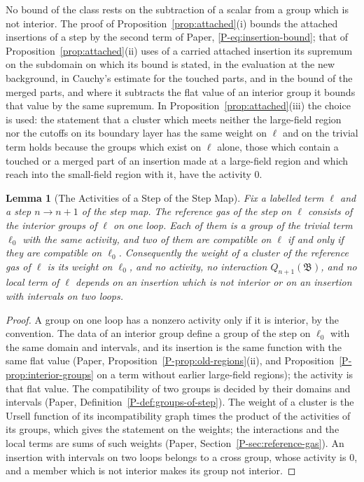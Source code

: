 \documentclass[11pt]{preprint}
\numberwithin{equation}{section}
\newtheorem{lemma}{Lemma}[section]
\theoremstyle{definition}
\theoremstyle{remark}
\theoremstyle{plain}
\begin{document}
No bound of the class rests on the subtraction of a scalar from a group which is not interior. The proof of Proposition~\ref{prop:attached}(i) bounds the attached insertions of a step by the second term of Paper, \eqref{P-eq:insertion-bound}; that of Proposition~\ref{prop:attached}(ii) uses of a carried attached insertion its supremum on the subdomain on which its bound is stated, in the evaluation at the new background, in Cauchy's estimate for the touched parts, and in the bound of the merged parts, and where it subtracts the flat value of an interior group it bounds that value by the same supremum. In Proposition~\ref{prop:attached}(iii) the choice is used: the statement that a cluster which meets neither the large-field region nor the cutoffs on its boundary layer has the same weight on $\ell$ and on the trivial term holds because the groups which exist on $\ell$ alone, those which contain a touched or a merged part of an insertion made at a large-field region and which reach into the small-field region with it, have the activity $0$.

\begin{lemma}[The Activities of a Step of the Step Map]\label{lem:activities-content}
Fix a labelled term $\ell$ and a step $n \to n + 1$ of the step map. The reference gas of the step on $\ell$ consists of the interior groups of $\ell$ on one loop. Each of them is a group of the trivial term $\ell_0$ with the same activity, and two of them are compatible on $\ell$ if and only if they are compatible on $\ell_0$. Consequently the weight of a cluster of the reference gas of $\ell$ is its weight on $\ell_0$, and no activity, no interaction $Q_{n+1}(\mathfrak B)$, and no local term of $\ell$ depends on an insertion which is not interior or on an insertion with intervals on two loops.
\end{lemma}

\begin{proof}
A group on one loop has a nonzero activity only if it is interior, by the convention. The data of an interior group define a group of the step on $\ell_0$ with the same domain and intervals, and its insertion is the same function with the same flat value (Paper, Proposition~\ref{P-prop:old-regions}(ii), and Proposition~\ref{P-prop:interior-groups} on a term without earlier large-field regions); the activity is that flat value. The compatibility of two groups is decided by their domains and intervals (Paper, Definition~\ref{P-def:groups-of-step}). The weight of a cluster is the Ursell function of its incompatibility graph times the product of the activities of its groups, which gives the statement on the weights; the interactions and the local terms are sums of such weights (Paper, Section~\ref{P-sec:reference-gas}). An insertion with intervals on two loops belongs to a cross group, whose activity is $0$, and a member which is not interior makes its group not interior.
\end{proof}
\end{document}
